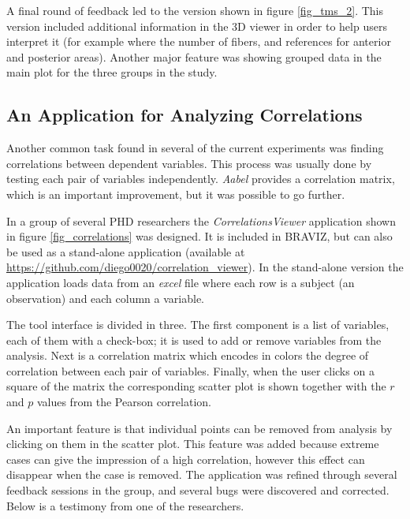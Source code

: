 A final round of feedback led to the version shown in figure \ref{fig_tms_2}. This version included additional information in the 3D viewer in order to help users interpret it (for example where the number of fibers, and references for anterior and posterior areas). Another major feature was showing grouped data in the main plot for the three groups in the study.



\subsection{An Application for Analyzing Correlations}

Another common task found in several of the current experiments was finding correlations between dependent variables. This process was usually done by testing each pair of variables independently. \emph{Aabel} provides a correlation matrix, which is an important improvement, but it was possible to go further. 

In a group of several PHD researchers the \emph{CorrelationsViewer} application shown in figure \ref{fig_correlations} was designed. It is included in BRAVIZ, but can also be used as a stand-alone application (available at \url{https://github.com/diego0020/correlation_viewer}). In the stand-alone version the application loads data from an \emph{excel} file where each row is a subject (an observation) and each column a variable. 

The tool interface is divided in three. The first component is a list of variables, each of them with a check-box; it is used to add or remove variables from the analysis. Next is a correlation matrix which encodes in colors the degree of correlation between each pair of variables. Finally, when the user clicks on a square of the matrix the corresponding scatter plot is shown together with the $r$ and $p$ values from the Pearson correlation. 

An important feature is that individual points can be removed from analysis by clicking on them in the scatter plot. This feature was added because extreme cases can give the impression of a high correlation, however this effect can disappear when the case is removed. The application was refined through several feedback sessions in the group, and several bugs were discovered and corrected.  Below is a testimony from one of the researchers.

